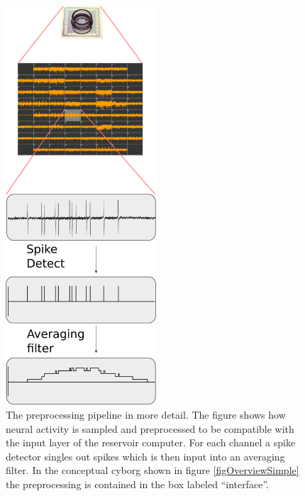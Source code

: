 \begin{figure}[h!]
  \centering
  \includegraphics[width=0.5\textwidth]{fig/system4.png}
  \caption{
    The preprocessing pipeline in more detail.
    The figure shows how neural activity is sampled and preprocessed to
    be compatible with the input layer of the reservoir computer.
    For each channel a spike detector singles out spikes which is then input
    into an averaging filter.
    In the conceptual cyborg shown in figure \ref{figOverviewSimple} the
    preprocessing is contained in the box labeled ``interface''.
  }
  \label{figWaves}
\end{figure}
